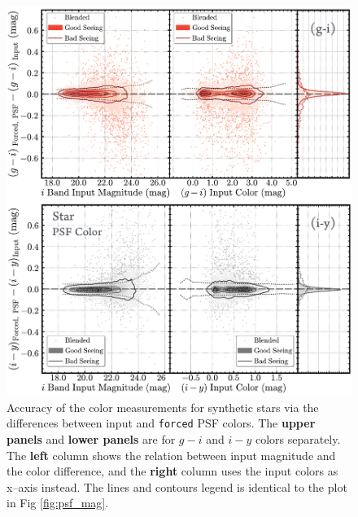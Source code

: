\documentclass[useamsfonts]{pasj01}
\def\forced{\texttt{forced}}
\begin{document}
\begin{figure}
    \begin{center}
        \includegraphics[width=\textwidth]{fig/synpipe_psf_color}
    \end{center}
    \caption{
        Accuracy of the color measurements for synthetic stars via the differences
        between input and \forced{} PSF colors.
        The \textbf{upper panels} and \textbf{lower panels} are for $g-i$ and $i-y$
        colors separately.
        The \textbf{left} column shows the relation between input magnitude and
        the color difference, and the \textbf{right} column uses the input colors as
        x--axis instead.
        The lines and contours legend is identical to the plot in Fig \ref{fig:psf_mag}.
        }
    \label{fig:psf_color}
\end{figure}
\end{document}
